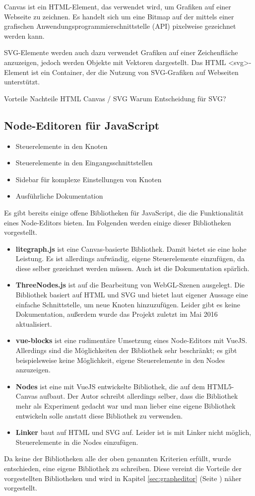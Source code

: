 Canvas ist ein HTML-Element, das verwendet wird, um Grafiken auf einer Webseite zu zeichnen. Es handelt sich um eine Bitmap auf der mittels einer grafischen Anwendungsprogrammierschnittstelle (API) pixelweise gezeichnet werden kann.

SVG-Elemente werden auch dazu verwendet Grafiken auf einer Zeichenfläche anzuzeigen, jedoch werden Objekte mit Vektoren dargestellt. Das HTML <svg>-Element ist ein Container, der die Nutzung von SVG-Grafiken auf Webseiten unterstützt.

Vorteile Nachteile HTML Canvas / SVG
Warum Entscheidung für SVG?

\subsection{Node-Editoren für JavaScript}


\begin{itemize}
    \item Steuerelemente in den Knoten
    \item Steuerelemente in den Eingangsschnittstellen
    \item Sidebar für komplexe Einstellungen von Knoten
    \item Ausführliche Dokumentation
\end{itemize}

Es gibt bereits einige offene Bibliotheken für JavaScript, die die Funktionalität eines Node-Editors bieten. Im Folgenden werden einige dieser Bibliotheken vorgestellt.

\begin{itemize}
    \item \textbf{litegraph.js} ist eine Canvas-basierte Bibliothek. Damit bietet sie eine hohe Leistung. Es ist allerdings aufwändig, eigene Steuerelemente einzufügen, da diese selber gezeichnet werden müssen. Auch ist die Dokumentation spärlich. \cite{litegraph}
    \item \textbf{ThreeNodes.js} ist auf die Bearbeitung von WebGL-Szenen ausgelegt. Die Bibliothek basiert auf HTML und SVG und bietet laut eigener Aussage eine einfache Schnittstelle, um neue Knoten hinzuzufügen. Leider gibt es keine Dokumentation, außerdem wurde das Projekt zuletzt im Mai 2016 aktualisiert. \cite{threenodes}
    \item \textbf{vue-blocks} ist eine rudimentäre Umsetzung eines Node-Editors mit VueJS. Allerdings sind die Möglichkeiten der Bibliothek sehr beschränkt; es gibt beispielsweise keine Möglichkeit, eigene Steuerelemente in den Nodes anzuzeigen. \cite{vueblocks}
    \item \textbf{Nodes} ist eine mit VueJS entwickelte Bibliothek, die auf dem HTML5-Canvas aufbaut. Der Autor schreibt allerdings selber, dass die Bibliothek mehr als Experiment gedacht war und man lieber eine eigene Bibliothek entwickeln solle anstatt diese Bibliothek zu verwenden. \cite{nodes}
    \item \textbf{Linker} baut auf HTML und SVG auf. Leider ist is mit Linker nicht möglich, Steuerelemente in die Nodes einzufügen. \cite{linker}
\end{itemize}

Da keine der Bibliotheken alle der oben genannten Kriterien erfüllt, wurde entschieden, eine eigene Bibliothek zu schreiben. Diese vereint die Vorteile der vorgestellten Bibliotheken und wird in Kapitel \ref{sec:grapheditor} (Seite \pageref{sec:grapheditor}) näher vorgestellt.